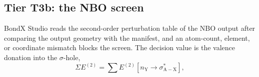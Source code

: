 \documentclass[journal=jcisd8,manuscript=article,layout=two-column]{achemso}
\newcommand{\ET}{E^{(2)}}
\newcommand{\BX}{BondX Studio}
\newcommand{\kcal}{kcal\,mol$^{-1}$}
\begin{document}
\subsection{Tier T3b: the NBO screen}
\BX{} reads the second-order perturbation table of the NBO output\cite{Reed1988,NBO31} after comparing the output geometry with the manifest, and an atom-count, element, or coordinate mismatch blocks the screen. The decision value is the valence donation into the $\sigma$-hole,
\begin{equation}
\Sigma\ET=\sum\ET\!\left[n_\mathrm{Y}\!\rightarrow\!\sigma^*_\mathrm{A-X}\right],
\end{equation}
\end{document}
